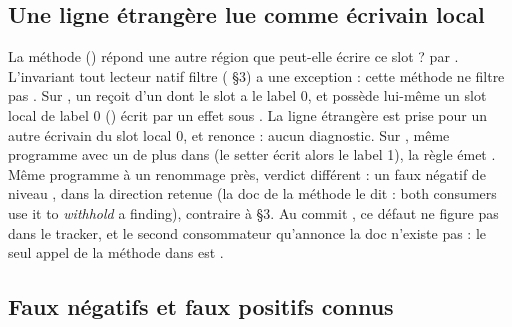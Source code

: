 \subsection{Une ligne étrangère lue comme écrivain local}

La méthode  () répond \og une autre région que  peut-elle écrire ce slot ?\fg{} par . L'invariant \og tout lecteur natif filtre \fg{} ( §3) a une exception : cette méthode ne filtre pas . Sur , un  reçoit  d'un  dont le slot  a le label 0, et possède lui-même un slot local de label 0 () écrit par un effet  sous \code{[b]}. La ligne étrangère  est prise pour un autre écrivain du slot local 0, et  renonce : aucun diagnostic. Sur , même programme avec un  de plus dans  (le setter écrit alors le label 1), la règle émet . Même programme à un renommage près, verdict différent : un faux négatif de niveau \Warning{}, dans la direction \og retenue\fg{} (la doc de la méthode le dit : \og both consumers use it to \emph{withhold} a finding\fg{}), contraire à  §3. Au commit \snapshotCommit, ce défaut ne figure pas dans le tracker, et le \og second consommateur\fg{} qu'annonce la doc n'existe pas : le seul appel de la méthode dans  est .

\subsection{Faux négatifs et faux positifs connus}

